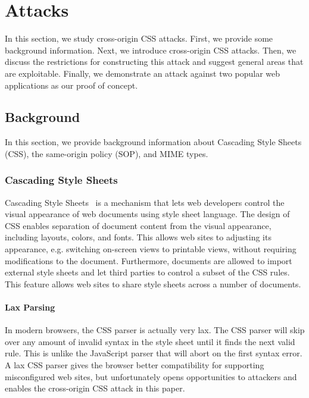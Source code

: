 \documentclass{acm_proc_article-sp}
\begin{document}
\section{Attacks} \label{sec:attacks}
In this section, we study cross-origin CSS attacks. First, we provide some background information. Next, we introduce cross-origin CSS attacks. Then, we discuss the restrictions for constructing this attack and suggest general areas that are exploitable. Finally, we demonstrate an attack against two popular web applications as our proof of concept.

\subsection{Background}
In this section, we provide background information about Cascading Style Sheets (CSS), the same-origin policy (SOP), and MIME types.

\subsubsection{Cascading Style Sheets}
Cascading Style Sheets~\cite{css} is a mechanism that lets web developers control the visual appearance of web documents using style sheet language. The design of CSS enables separation of document content from the visual appearance, including layouts, colors, and fonts. This allows web sites to adjusting its appearance, e.g. switching on-screen views to printable views, without requiring modifications to the document. Furthermore, documents are allowed to import external style sheets and let third parties to control a subset of the CSS rules. This feature allows web sites to share style sheets across a number of documents.

\paragraph{Lax Parsing}
In modern browsers, the CSS parser is actually very lax. The CSS parser will skip over any amount of invalid syntax in the style sheet until it finds the next valid rule. This is unlike the JavaScript parser that will abort on the first syntax error. A lax CSS parser gives the browser better compatibility for supporting misconfigured web sites, but unfortunately opens opportunities to attackers and enables the cross-origin CSS attack in this paper.

\end{document}
